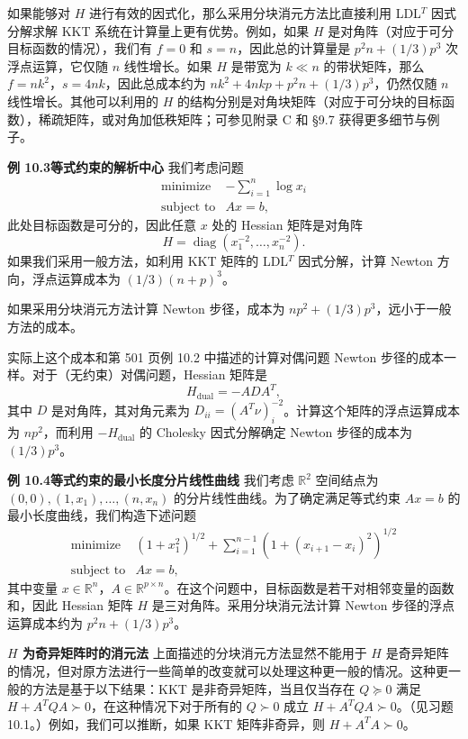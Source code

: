 \documentclass[UTF8,12pt,a4paper,fontset=fandol]{ctexart}
\begin{document}
如果能够对 $H$ 进行有效的因式化，那么采用分块消元方法比直接利用 LDL$^T$ 因式分解求解 KKT 系统在计算量上更有优势。例如，如果 $H$ 是对角阵（对应于可分目标函数的情况），我们有 $f=0$ 和 $s=n$，因此总的计算量是 $p^2n+(1/3)p^3$ 次浮点运算，它仅随 $n$ 线性增长。如果 $H$ 是带宽为 $k\ll n$ 的带状矩阵，那么 $f=nk^2$，$s=4nk$，因此总成本约为 $nk^2+4nkp+p^2n+(1/3)p^3$，仍然仅随 $n$ 线性增长。其他可以利用的 $H$ 的结构分别是对角块矩阵（对应于可分块的目标函数），稀疏矩阵，或对角加低秩矩阵；可参见附录 C 和 \S9.7 获得更多细节与例子。

\noindent\textbf{例 10.3\quad 等式约束的解析中心}\quad
我们考虑问题
\[
\begin{array}{ll}
\mbox{minimize} & -\displaystyle\sum_{i=1}^n\log x_i\\
\mbox{subject to} & Ax=b,
\end{array}
\]
此处目标函数是可分的，因此任意 $x$ 处的 Hessian 矩阵是对角阵
\[
H=\operatorname{diag}(x_1^{-2},\ldots,x_n^{-2}).
\]
如果我们采用一般方法，如利用 KKT 矩阵的 LDL$^T$ 因式分解，计算 Newton 方向，浮点运算成本为 $(1/3)(n+p)^3$。

如果采用分块消元方法计算 Newton 步径，成本为 $np^2+(1/3)p^3$，远小于一般方法的成本。

实际上这个成本和第 501 页例 10.2 中描述的计算对偶问题 Newton 步径的成本一样。对于（无约束）对偶问题，Hessian 矩阵是
\[
H_{\mathrm{dual}}=-ADA^T,
\]
其中 $D$ 是对角阵，其对角元素为 $D_{ii}=(A^T\nu)_i^{-2}$。计算这个矩阵的浮点运算成本为 $np^2$，而利用 $-H_{\mathrm{dual}}$ 的 Cholesky 因式分解确定 Newton 步径的成本为 $(1/3)p^3$。

\noindent\textbf{例 10.4\quad 等式约束的最小长度分片线性曲线}\quad
我们考虑 $\mathbb{R}^2$ 空间结点为 $(0,0),(1,x_1),\ldots,(n,x_n)$ 的分片线性曲线。为了确定满足等式约束 $Ax=b$ 的最小长度曲线，我们构造下述问题
\[
\begin{array}{ll}
\mbox{minimize} & (1+x_1^2)^{1/2}+\displaystyle\sum_{i=1}^{n-1}(1+(x_{i+1}-x_i)^2)^{1/2}\\
\mbox{subject to} & Ax=b,
\end{array}
\]
其中变量 $x\in\mathbb{R}^n$，$A\in\mathbb{R}^{p\times n}$。在这个问题中，目标函数是若干对相邻变量的函数和，因此 Hessian 矩阵 $H$ 是三对角阵。采用分块消元法计算 Newton 步径的浮点运算成本约为 $p^2n+(1/3)p^3$。

\noindent\textbf{$H$ 为奇异矩阵时的消元法}\quad
上面描述的分块消元方法显然不能用于 $H$ 是奇异矩阵的情况，但对原方法进行一些简单的改变就可以处理这种更一般的情况。这种更一般的方法是基于以下结果：KKT 是非奇异矩阵，当且仅当存在 $Q\succeq0$ 满足 $H+A^TQA\succ0$，在这种情况下对于所有的 $Q\succ0$ 成立 $H+A^TQA\succ0$。（见习题 10.1。）例如，我们可以推断，如果 KKT 矩阵非奇异，则 $H+A^TA\succ0$。
\end{document}
